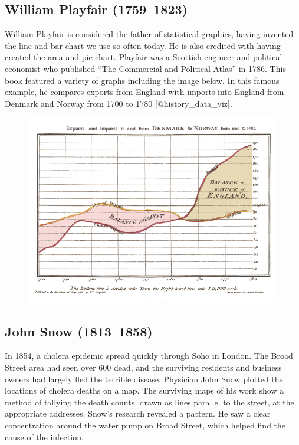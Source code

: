 \documentclass[]{book}
\theoremstyle{definition}
\theoremstyle{definition}
\theoremstyle{definition}
\theoremstyle{remark}
\begin{document}
\subsection{William Playfair
(1759--1823)}\label{william-playfair-17591823}

William Playfair is considered the father of statistical graphics,
having invented the line and bar chart we use so often today. He is also
credited with having created the area and pie chart. Playfair was a
Scottish engineer and political economist who published ``The Commercial
and Political Atlas'' in 1786. This book featured a variety of graphs
including the image below. In this famous example, he compares exports
from England with imports into England from Denmark and Norway from 1700
to 1780 {[}@history\_data\_viz{]}.

\begin{figure}
\centering
\includegraphics{images/Playfair.png}
\caption{}
\end{figure}

\subsection{John Snow (1813--1858)}\label{john-snow-18131858}

In 1854, a cholera epidemic spread quickly through Soho in London. The
Broad Street area had seen over 600 dead, and the surviving residents
and business owners had largely fled the terrible disease. Physician
John Snow plotted the locations of cholera deaths on a map. The
surviving maps of his work show a method of tallying the death counts,
drawn as lines parallel to the street, at the appropriate addresses.
Snow's research revealed a pattern. He saw a clear concentration around
the water pump on Broad Street, which helped find the cause of the
infection.
\end{document}
